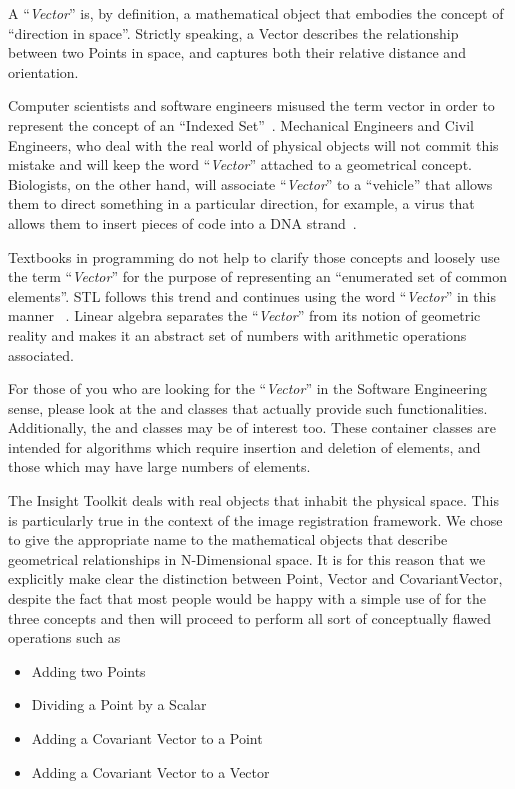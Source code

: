 A ``\emph{Vector}'' is, by definition, a mathematical object that embodies the
concept of ``direction in space''. Strictly speaking, a Vector describes the
relationship between two Points in space, and captures both their relative
distance and orientation.

Computer scientists and software engineers misused the term vector in order to
represent the concept of an ``Indexed Set''~\cite{Austern1999}.  Mechanical
Engineers and Civil Engineers, who deal with the real world of physical objects
will not commit this mistake and will keep the word ``\emph{Vector}'' attached
to a geometrical concept.  Biologists, on the other hand, will associate
``\emph{Vector}'' to a ``vehicle'' that allows them to direct something in a
particular direction, for example, a virus that allows them to insert pieces of
code into a DNA strand~\cite{Lodish2000}.

Textbooks in programming do not help to clarify those concepts and loosely use
the term ``\emph{Vector}'' for the purpose of representing an ``enumerated set
of common elements''. STL follows this trend and continues using the word
``\emph{Vector}'' in this manner ~\cite{Austern1999,Alexandrescu2001}. Linear algebra separates the
``\emph{Vector}'' from its notion of geometric reality and makes it an
abstract set of numbers with arithmetic operations associated.

For those of you who are looking for the ``\emph{Vector}'' in the Software
Engineering sense, please look at the  and 
classes that actually provide such functionalities. Additionally, the
 and  classes may be of interest
too. These container classes are intended for algorithms which require insertion
and deletion of elements, and those which may have large numbers of elements.

The Insight Toolkit deals with real objects that inhabit the physical space.
This is particularly true in the context of the image registration framework.
We chose to give the appropriate name to the mathematical objects that describe
geometrical relationships in N-Dimensional space. It is for this reason that we
explicitly make clear the distinction between Point, Vector and CovariantVector,
despite the fact that most people would be happy with a simple use of
 for the three concepts and then will proceed to perform all
sort of conceptually flawed operations such as

\begin{itemize}
\item Adding two Points
\item Dividing a Point by a Scalar
\item Adding a Covariant Vector to a Point
\item Adding a Covariant Vector to a Vector
\end{itemize}


